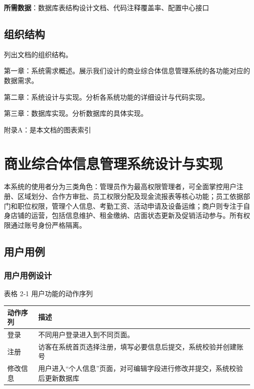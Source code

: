 \documentclass[]{article}
\begin{document}
\textbf{所需数据}：数据库表结构设计文档、代码注释覆盖率、配置中心接口

\hypertarget{ux7ec4ux7ec7ux7ed3ux6784}{%
  \subsection{组织结构}\label{ux7ec4ux7ec7ux7ed3ux6784}}

列出文档的组织结构。

第一章：系统需求概述。展示我们设计的商业综合体信息管理系统的各功能对应的数据需求。

第二章：系统设计与实现。分析各系统功能的详细设计与代码实现。

第三章：数据库实现。分析数据库的具体实现。

附录A：是本文档的图表索引

\hypertarget{ux5546ux4e1aux7efcux5408ux4f53ux4fe1ux606fux7ba1ux7406ux7cfbux7edfux8bbeux8ba1ux4e0eux5b9eux73b0}{%
  \section{商业综合体信息管理系统设计与实现}\label{ux5546ux4e1aux7efcux5408ux4f53ux4fe1ux606fux7ba1ux7406ux7cfbux7edfux8bbeux8ba1ux4e0eux5b9eux73b0}}

本系统的使用者分为三类角色：管理员作为最高权限管理者，可全面掌控用户注册、区域划分、合作方审批、员工权限分配及现金流报表等核心功能；员工依据部门和职位权限，管理个人信息、考勤工资、活动申请及设备运维；商户则专注于自身店铺的运营，包括信息维护、租金缴纳、店面状态更新及促销活动参与。所有权限通过账号身份严格隔离。

\hypertarget{ux7528ux6237ux7528ux4f8b}{%
  \subsection{ 用户用例}\label{ux7528ux6237ux7528ux4f8b}}

\hypertarget{ux7528ux6237ux7528ux4f8bux8bbeux8ba1}{%
  \subsubsection{用户用例设计}\label{ux7528ux6237ux7528ux4f8bux8bbeux8ba1}}

\protect\hypertarget{_Toc153186375}{}{\protect\hypertarget{_Toc394245026}{}{}}表格
2‑1 用户功能的动作序列

\begin{longtable}[]{@{}ll@{}}
  \toprule
  动作序列 & 描述\tabularnewline
  \midrule
  \endhead
  登录   & 不同用户登录进入到不同页面。\tabularnewline
  注册   &
  访客在系统首页选择注册，填写必要信息后提交，系统校验并创建账号\tabularnewline
  修改信息 &
  用户进入``个人信息''页面，对可编辑字段进行修改并提交，系统校验后更新数据库\tabularnewline
  \bottomrule
\end{longtable}
\end{document}
